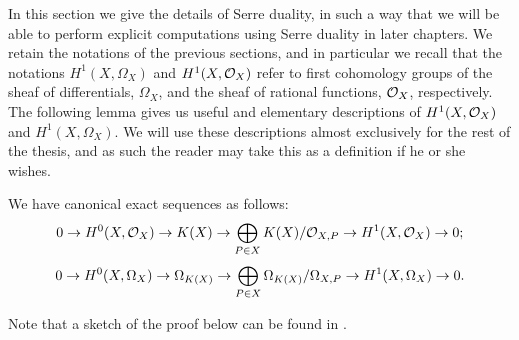 In this section we give the details of Serre duality, in such a way that we will be able to perform explicit computations using Serre duality in later chapters.
We retain the notations of the previous sections, and in particular we recall that the notations $H^1(X,\Omega_X)$ and $H^1(X,\mathcal{O}_X)$ refer to first cohomology groups of the sheaf of differentials, $\Omega_X$, and the sheaf of rational functions, ${\cal O}_X$, respectively.
The following lemma gives us useful and elementary descriptions of $H^1(X,\mathcal{O}_X)$ and $H^1(X,\Omega_X)$.
We will use these descriptions almost exclusively for the rest of the thesis, and as such the reader may take this as a definition if he or she wishes.
    \begin{lem}\label{lemmaexactsequenceofhoneandhzero}
    We have canonical exact sequences as follows:
        \begin{equation}\label{equationinitialdualitylesfunctions}
        0 \rightarrow H^0(X,{\cal O}_X) \rightarrow K(X) \rightarrow \bigoplus_{P \in X} K(X)/{\cal O}_{X,P} \rightarrow H^1(X,\mathcal{O}_X) \rightarrow  0;
        \end{equation}
        \begin{equation}\label{equationinitialdualitysesdifferentials}
        0 \rightarrow {H^0(X,\Omega_X)} \rightarrow \Omega_{K(X)} \rightarrow \bigoplus_{P \in X}\Omega_{K(X)}/\Omega_{X,P} \rightarrow H^1(X,\Omega_X) \rightarrow 0.
        \end{equation}
    \end{lem}
    \begin{rem}
    Note that a sketch of the proof below can be found in \cite[Pg.\ 248]{hart}.
        \end{rem}
